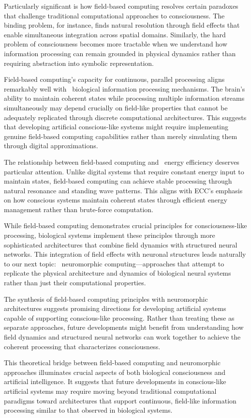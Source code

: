 Particularly significant is how field-based computing resolves certain paradoxes that challenge traditional computational approaches to consciousness. The~ binding problem, for instance, finds natural resolution through field effects that enable simultaneous integration across spatial domains. Similarly, the hard problem of consciousness becomes more tractable when we understand how information processing can remain grounded in physical dynamics rather than requiring abstraction into symbolic representation.

Field-based computing's capacity for continuous, parallel processing aligns remarkably well with~ biological information processing mechanisms. The brain's ability to maintain coherent states while processing multiple information streams simultaneously may depend crucially on field-like properties that cannot be adequately replicated through discrete computational architectures. This suggests that developing artificial conscious-like systems might require implementing genuine field-based computing capabilities rather than merely simulating them through digital approximations.

The relationship between field-based computing and~ energy efficiency deserves particular attention. Unlike digital systems that require constant energy input to maintain states, field-based computing can achieve stable processing through natural resonance and standing wave patterns. This aligns with ECC's emphasis on how conscious systems maintain coherent states through efficient energy management rather than brute-force computation.

While field-based computing demonstrates crucial principles for consciousness-like processing, biological systems implement these principles through more sophisticated architectures that combine field dynamics with structured neural networks. This integration of field effects with neuronal structures leads naturally to our next topic:~ neuromorphic computing—approaches that attempt to replicate the physical architecture and dynamics of biological neural systems rather than just their computational properties.

The synthesis of field-based computing principles with neuromorphic architectures suggests promising directions for developing artificial systems capable of supporting conscious-like processing. Rather than treating these as separate approaches, future developments might benefit from understanding how field dynamics and structured neural networks can work together to achieve the coherent processing that characterizes consciousness.

This theoretical bridge between field-based computing and neuromorphic approaches illuminates crucial aspects of both biological consciousness and~ artificial intelligence. It suggests that future developments in conscious-like artificial systems may require moving beyond traditional computational paradigms toward architectures that support continuous, field-like information processing similar to that observed in biological systems.